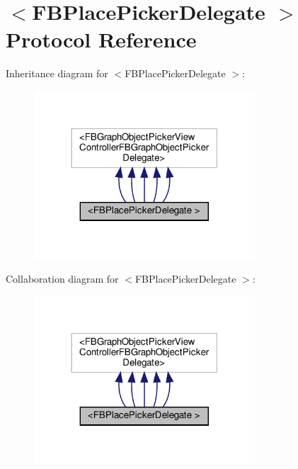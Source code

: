 \hypertarget{protocolFBPlacePickerDelegate_01-p}{}\section{$<$F\+B\+Place\+Picker\+Delegate $>$ Protocol Reference}
\label{protocolFBPlacePickerDelegate_01-p}


Inheritance diagram for $<$F\+B\+Place\+Picker\+Delegate $>$\+:
\nopagebreak
\begin{figure}[H]
\begin{center}
\leavevmode
\includegraphics[width=234pt]{protocolFBPlacePickerDelegate_01-p__inherit__graph}
\end{center}
\end{figure}


Collaboration diagram for $<$F\+B\+Place\+Picker\+Delegate $>$\+:
\nopagebreak
\begin{figure}[H]
\begin{center}
\leavevmode
\includegraphics[width=234pt]{protocolFBPlacePickerDelegate_01-p__coll__graph}
\end{center}
\end{figure}
